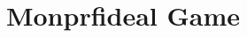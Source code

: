 \documentclass[a4paper,landscape]{article}
\title{Monprfideal Game}
\begin{document}
\maketitle
\begin{center}

\end{center}
\begin{center}

\end{center}
\begin{center}

\end{center}
\end{document}
